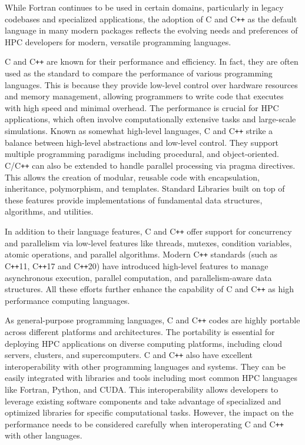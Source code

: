 While Fortran continues to be used in certain domains, particularly in legacy codebases and specialized applications, the adoption of C and C\texttt{++} as the default language in many modern packages reflects the evolving needs and preferences of HPC developers for modern, versatile programming languages.

C and C\texttt{++} are known for their performance and efficiency. 
In fact, they are often used as the standard to compare the performance of various programming languages. 
This is because they provide low-level control over hardware resources and memory management, allowing programmers to write code that executes with high speed and minimal overhead. 
The performance is crucial for HPC applications, which often involve computationally extensive tasks and large-scale simulations.
Known as somewhat high-level languages, C and C\texttt{++} strike a balance between high-level abstractions and low-level control. They support multiple programming paradigms including procedural, and object-oriented.
C/C\texttt{++} can also be extended to handle parallel processing via pragma directives.
This allows the creation of modular, reusable code with encapsulation, inheritance, polymorphism, and templates.
Standard Libraries built on top of these features provide implementations of fundamental data structures, algorithms, and utilities.

In addition to their language features, C and C\texttt{++} offer support for concurrency and parallelism via low-level features like threads, mutexes, condition variables, atomic operations, and parallel algorithms.
Modern C\texttt{++} standards (such as C\texttt{++}11, C\texttt{++}17 and C\texttt{++}20) have introduced high-level features to manage asynchronous execution, parallel computation, and parallelism-aware data structures.
All these efforts further enhance the capability of C and C\texttt{++} as high performance computing languages.

As general-purpose programming languages, C and C\texttt{++} codes are highly portable across different platforms and architectures. 
The portability is essential for deploying HPC applications on diverse computing platforms, including cloud servers, clusters, and supercomputers.
C and C\texttt{++} also have excellent interoperability with other programming languages and systems. 
They can be easily integrated with libraries and tools including most common HPC languages like Fortran, Python, and CUDA.
This interoperability allows developers to leverage existing software components and take advantage of specialized and optimized libraries for specific computational tasks.
However, the impact on the performance needs to be considered carefully when interoperating C and C\texttt{++} with other languages.

